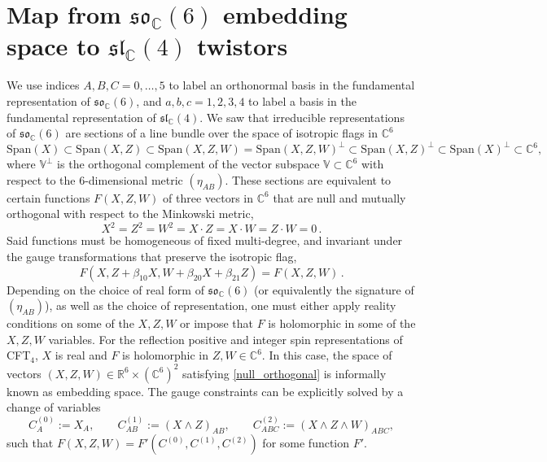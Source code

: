 \documentclass{article}
\def \bg {\beta}
\def \Rs {\mathbb{R}}
\def \Cs {\mathbb{C}}
\begin{document}
\section{Map from \texorpdfstring{$\mathfrak{so}_{\Cs}(6)$}{so(6;C)} embedding space to \texorpdfstring{$\mathfrak{sl}_{\Cs}(4)$}{sl(4;C)} twistors}
\label{app:twistors_from_emb_space}
We use indices $A,B,C=0,\dots,5$ to label an orthonormal basis in the fundamental representation of $\mathfrak{so}_{\Cs}(6)$, and $a,b,c=1,2,3,4$ to label a basis in the fundamental representation of $\mathfrak{sl}_{\Cs}(4)$. We saw that irreducible representations of $\mathfrak{so}_{\Cs}(6)$ are sections of a line bundle over the space of isotropic flags in $\Cs^6$
\begin{equation}
    \mathrm{Span}(X) \subset  \mathrm{Span}(X,Z) \subset  \mathrm{Span}(X,Z,W) = \mathrm{Span}(X,Z,W)^{\perp} \subset \mathrm{Span}(X,Z)^{\perp} \subset \mathrm{Span}(X)^{\perp} \subset \Cs^6,
\end{equation}
where $\mathbb{V}^{\perp}$ is the orthogonal complement of the vector subspace $\mathbb{V} \subset \Cs^{6}$  with respect to the 6-dimensional metric  $(\eta_{AB})$. These sections are equivalent to certain functions $F(X,Z,W)$ of three vectors in $\Cs^6$ that are null and mutually orthogonal with respect to the Minkowski metric,
\begin{equation}
    X^2 = Z^2 = W^2 = X\cdot Z = X\cdot W = Z\cdot W = 0\,.
    \label{null_orthogonal}
\end{equation}
Said functions must be homogeneous of fixed multi-degree, and invariant under the gauge transformations that preserve the isotropic flag,
\begin{equation}
F(X, Z+\bg_{10} X,W+\bg_{20} X + \bg_{21} Z) = F(X,Z,W)\,. 
\end{equation}
Depending on the choice of real form of $\mathfrak{so}_{\Cs}(6)$ (or equivalently the signature of $(\eta_{AB})$), as well as the choice of representation, one must either apply reality conditions on some of the $X,Z,W$ or impose that $F$ is holomorphic in some of the $X,Z,W$ variables. For the reflection positive and integer spin representations of CFT$_4$, $X$ is real and $F$ is holomorphic in $Z,W \in \Cs^6$. In this case, the space of vectors $(X,Z,W) \in \Rs^6 \times  (\Cs^6)^2$ satisfying \eqref{null_orthogonal} is informally known as embedding space. The gauge constraints can be explicitly solved by a change of variables 
\begin{equation}
    C^{(0)}_A := X_A, \qquad C^{(1)}_{AB} := (X\wedge Z)_{AB}, \qquad C^{(2)}_{ABC} := (X\wedge Z \wedge W)_{ABC}, 
    \label{C_tensors}
\end{equation}
such that $ F(X,Z,W) =  F'(C^{(0)},C^{(1)},C^{(2)})$ for some function $F'$. 
\end{document}
